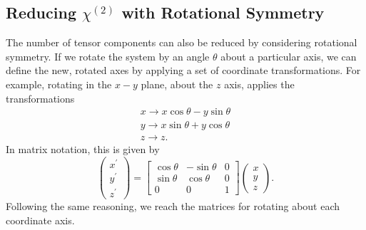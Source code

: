 \subsection{Reducing \texorpdfstring{$\chi^{(2)}$}{Lg} with Rotational Symmetry}\label{sec:background:NonlinearOptics:rotation}
The number of tensor components can also be reduced by considering rotational symmetry. If we rotate the system by an angle $\theta$ about a particular axis, we can define the new, rotated axes by applying a set of coordinate transformations. For example, rotating in the $x-y$ plane, about the $z$ axis, applies the transformations
\begin{equation}\label{eq:background:NonlinearOptics:rotation:generalTrans}
    \begin{split}
        x \rightarrow x \cos{\theta} - y \sin{\theta} \\
        y \rightarrow x \sin{\theta} +y \cos{\theta} \\
        z \rightarrow z.
    \end{split}
\end{equation}
In matrix notation, this is given by
\begin{equation}\label{eq:background:NonlinearOptics:rotation:MatrixTrans}
	\begin{pmatrix}
		x^{\prime}\\ 
		y^{\prime}\\ 
		z^{\prime}
	\end{pmatrix} =
	\begin{bmatrix}
		\cos{\theta} & -\sin{\theta} & 0\\ 
		\sin{\theta} & \cos{\theta} & 0\\ 
		0 & 0 & 1
	\end{bmatrix}
	\begin{pmatrix}
		x\\ 
		y\\ 
		z
	\end{pmatrix}.
\end{equation}
Following the same reasoning, we reach the matrices for rotating about each coordinate axis.
